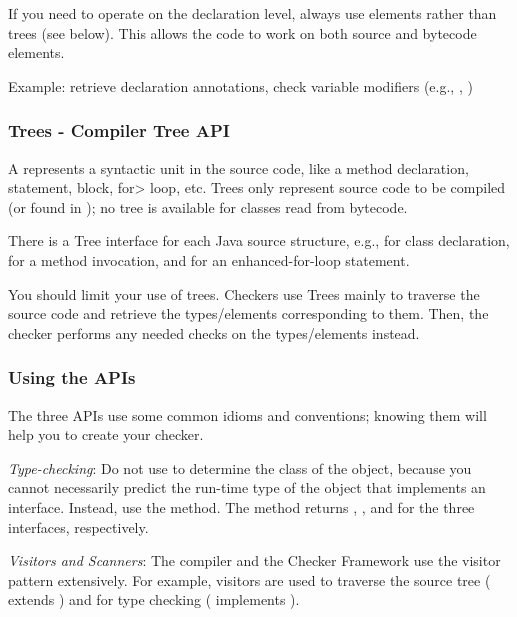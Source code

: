 If you need to operate on the declaration level, always use elements rather
than trees
(see below).  This allows the code to work on
both source and bytecode elements.

Example: retrieve declaration annotations, check variable
modifiers (e.g., , )


\subsubsection{Trees - Compiler Tree API\label{javac-trees}}

A  represents a syntactic unit in the source code,
like a method declaration, statement, block, \<for> loop, etc. Trees only
represent source code to be compiled (or found in );
no tree is available for classes read from bytecode.

There is a Tree interface for each Java source structure, e.g.,
 for class declaration, 
for a method invocation, and  for an enhanced-for-loop
statement.

You should limit your use of trees. Checkers use Trees mainly to
traverse the source code and retrieve the types/elements corresponding to
them.  Then, the checker performs any needed checks on the types/elements instead.


\subsubsection{Using the APIs}

The three APIs use some common idioms and conventions; knowing them will
help you to create your checker.

\emph{Type-checking}:
Do not use  to determine the class of the object,
because you cannot necessarily predict the run-time type of the object that
implements an interface.  Instead, use the  method.  The
method returns ,
, and 
for the three interfaces, respectively.

\emph{Visitors and Scanners}:
The compiler and the Checker Framework use the visitor pattern
extensively. For example, visitors are used to traverse the source tree
( extends
) and for type
checking ( implements
).

